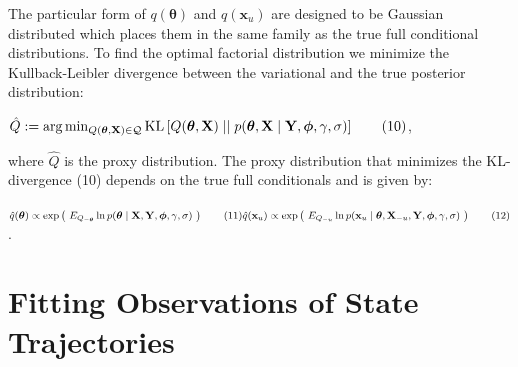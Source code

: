 \begin{par}
The particular form of $q(\boldsymbol\theta)$ and $q(\mathbf{x}_u)$ are designed to be Gaussian distributed which places them in the same family as the true full conditional distributions. To find the optimal factorial distribution we minimize the Kullback-Leibler divergence between the variational and the true posterior distribution:
\end{par} \vspace{1em}
\begin{par}
$\hat{Q} := \mathrm{arg} \min_{Q(\boldsymbol\theta,\mathbf{X}) \in \mathcal{Q}} \mathrm{KL}\left[ Q(\boldsymbol\theta,\mathbf{X}) \mid \mid p(\boldsymbol\theta,\mathbf{X} \mid\mathbf{Y},\boldsymbol\phi, \gamma,\mathbf\mathbf{\sigma}) \right] \qquad (10)$,
\end{par} \vspace{1em}
\begin{par}
where $\hat{Q}$ is the proxy distribution. The proxy distribution that minimizes the KL-divergence (10) depends on the true full conditionals and is given by:
\end{par} \vspace{1em}
\begin{par}
$\hat{q}({\boldsymbol\theta}) \propto \exp \left(~ E_{Q_{-\boldsymbol\theta}} \ln p(\boldsymbol\theta \mid\mathbf{X},\mathbf{Y},\boldsymbol\phi,\gamma,\mathbf\mathbf{\sigma}) ~\right) \qquad (11)\\\hat{q}(\mathbf{x}_u) \propto \exp\left( ~ E_{Q_{-u}} \ln p(\mathbf{x}_u\mid \boldsymbol\theta, \mathbf{X}_{-u},\mathbf{Y},\boldsymbol\phi,\gamma,\mathbf{\sigma}) ~ \right)\qquad (12)$.
\end{par} \vspace{1em}


\section{Fitting Observations of State Trajectories}


